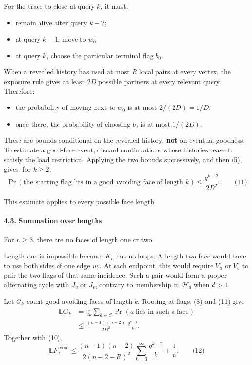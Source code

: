 \documentclass[
  11pt,
  a4paper,
]{article}
\providecommand{\tightlist}{%
  \setlength{\itemsep}{0pt}\setlength{\parskip}{0pt}}
\begin{document}
For the trace to close at query \(k\), it must:

\begin{itemize}
\tightlist
\item
  remain alive after query \(k-2\);
\item
  at query \(k-1\), move to \(w_0\);
\item
  at query \(k\), choose the particular terminal flag \(b_0\).
\end{itemize}

When a revealed history has used at most \(R\) local pairs at every
vertex, the exposure rule gives at least \(2D\) possible partners at
every relevant query. Therefore:

\begin{itemize}
\tightlist
\item
  the probability of moving next to \(w_0\) is at most \(2/(2D)=1/D\);
\item
  once there, the probability of choosing \(b_0\) is at most \(1/(2D)\).
\end{itemize}

These are bounds conditional on the revealed history, \textbf{not} on
eventual goodness. To estimate a good-face event, discard continuations
whose histories cease to satisfy the load restriction. Applying the two
bounds successively, and then (5), gives, for \(k\ge2\), \[
\boxed{
\Pr(\text{the starting flag lies in a good avoiding face of length }k)
\le
\frac{q^{k-2}}{2D^2}.
}
\qquad\text{(11)}
\]

This estimate applies to every possible face length.

\paragraph{4.3. Summation over lengths}\label{summation-over-lengths}

For \(n\ge3\), there are no faces of length one or two.

Length one is impossible because \(K_n\) has no loops. A length-two face
would have to use both sides of one edge \(uv\). At each endpoint, this
would require \(V_u\) or \(V_v\) to pair the two flags of that same
incidence. Such a pair would form a proper alternating cycle with
\(J_u\) or \(J_v\), contrary to membership in \(\mathcal H_d\) when
\(d>1\).

Let \(G_k\) count good avoiding faces of length \(k\). Rooting at flags,
(8) and (11) give \begin{equation*}
\begin{aligned}
\mathbb E G_k
&=
\frac1{2k}
\sum_{a\in S}
\Pr(a\text{ lies in such a face})\\
&\le
\frac{(n-1)(n-2)}{2D^2}\,
\frac{q^{k-2}}{k}.
\end{aligned}
\end{equation*} Together with (10), \[
\boxed{
\mathbb E F_n^{\mathrm{avoid}}
\le
\frac{(n-1)(n-2)}{2(n-2-R)^2}
\sum_{k=3}^{\infty}\frac{q^{k-2}}{k}
+\frac1n.
}
\qquad\text{(12)}
\]
\end{document}
